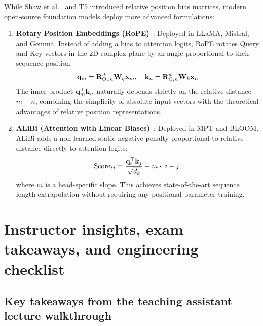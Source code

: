 \documentclass[../labs.tex]{subfiles}
\begin{document}
While Shaw et al.~\cite{shaw2018} and T5 introduced relative position bias matrices, modern open-source foundation models deploy more advanced formulations:
\begin{enumerate}
    \item \textbf{Rotary Position Embeddings (RoPE)}~\cite{su2024roformer}: Deployed in LLaMA, Mistral, and Gemma. Instead of adding a bias to attention logits, RoPE rotates Query and Key vectors in the 2D complex plane by an angle proportional to their sequence position:
    \begin{equation}
        \mathbf{q}_m = \mathbf{R}_{\Theta, m}^d \mathbf{W}_q \mathbf{x}_m, \quad \mathbf{k}_n = \mathbf{R}_{\Theta, n}^d \mathbf{W}_k \mathbf{x}_n
    \end{equation}
    The inner product $\mathbf{q}_m^\top \mathbf{k}_n$ naturally depends strictly on the relative distance $m - n$, combining the simplicity of absolute input vectors with the theoretical advantages of relative position representations.
    \item \textbf{ALiBi (Attention with Linear Biases)}~\cite{press2022alibi}: Deployed in MPT and BLOOM. ALiBi adds a non-learned static negative penalty proportional to relative distance directly to attention logits:
    \begin{equation}
        \text{Score}_{ij} = \frac{\mathbf{q}_i^\top \mathbf{k}_j}{\sqrt{d_k}} - m \cdot |i - j|
    \end{equation}
    where $m$ is a head-specific slope. This achieves state-of-the-art sequence length extrapolation without requiring any positional parameter training.
\end{enumerate}

\section{Instructor insights, exam takeaways, and engineering checklist}
\label{sec:lab02_exam_insights}

\subsection{Key takeaways from the teaching assistant lecture walkthrough}
\end{document}
